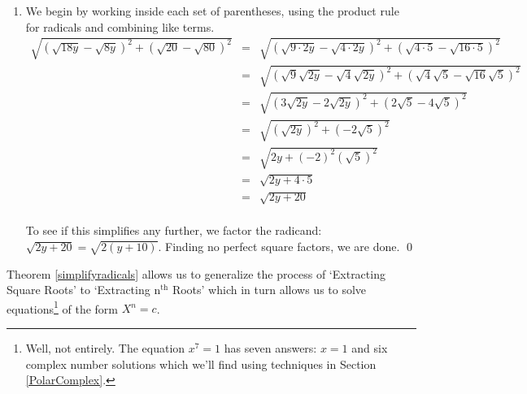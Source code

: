 \documentclass{ximera}
\begin{document}
{\begin{example}
\begin{enumerate}
\[\begin{array}{rclr}
& = & \dfrac{2x(x^2-3)}{(\sqrt[3]{x^2-4})^2} & \\

\end{array}\] We cannot reduce this any further because $x^2 - 3$ is irreducible over the rational numbers. 


\item  We begin by working inside each set of parentheses, using the product rule for radicals and combining like terms.\[ \begin{array}{rclr}


 \sqrt{(\sqrt{18y} - \sqrt{8y})^2 + (\sqrt{20} - \sqrt{80})^2} & = & \sqrt{(\sqrt{9\cdot 2y} - \sqrt{4 \cdot 2y})^2 + (\sqrt{4\cdot 5} - \sqrt{16 \cdot 5})^2} & \\[8pt]

& = & \sqrt{(\sqrt{9} \sqrt{2y} - \sqrt{4}\sqrt{2y})^2 + (\sqrt{4}\sqrt{5} - \sqrt{16}\sqrt{5})^2} & \\[8pt]


& = & \sqrt{(3\sqrt{2y} - 2\sqrt{2y})^2 + (2\sqrt{5} - 4\sqrt{5})^2} & \\[8pt]

& = & \sqrt{(\sqrt{2y})^2 + (-2\sqrt{5})^2} & \\[8pt]


& = & \sqrt{2y + (-2)^2(\sqrt{5})^2} & \\[8pt]


& = & \sqrt{2y + 4\cdot 5} & \\[8pt]

& = & \sqrt{2y + 20} & \\ 

\end{array} \]

To see if this simplifies any further, we factor the radicand:  $\sqrt{2y+20} = \sqrt{2(y+10)}$.  Finding no perfect square factors, we are done. \qed

\end{enumerate}

\end{example}

Theorem \ref{simplifyradicals} allows us to generalize the process of `Extracting Square Roots' to `Extracting $\text{n}^{\text{th}}$ Roots' which in turn allows us to solve equations\footnote{Well, not entirely.  The equation $x^{7} = 1$ has seven answers: $x = 1$ and six complex number solutions which we'll find using techniques in Section \ref{PolarComplex}.} of the form $X^n  = c$.

\label{extractingnthroots}

}
\end{document}
